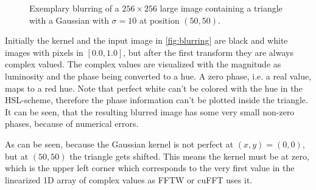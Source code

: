 \documentclass[10pt,a4paper]{article}
\begin{document}
\begin{figure}
\begin{center}
\begin{minipage}{0.5\linewidth}
\begin{center}
\begin{minipage}{0.5\linewidth}
\begin{center}
    \end{center}\end{minipage}\end{center}
    \end{minipage}\end{center}
    \caption{Exemplary blurring of a $256 \times 256$ large image containing a triangle with a Gaussian with $\sigma=10$ at position $(50,50)$.}
    \label{fig:blurring}
\end{figure}

Initially the kernel and the input image in \autoref{fig:blurring} are black and white images with pixels in $[0.0,1.0]$, but after the first transform they are always complex valued.
The complex values are visualized with the magnitude as luminosity and the phase being converted to a hue.
A zero phase, i.e. a real value, maps to a red hue.
Note that perfect white can't be colored with the hue in the HSL-scheme, therefore the phase information can't be plotted inside the triangle.
It can be seen, that the resulting blurred image has some very small non-zero phases, because of numerical errors.

As can be seen, because the Gaussian kernel is not perfect at $(x,y)=(0,0)$, but at $(50,50)$ the triangle gets shifted.
This means the kernel must be at zero, which is the upper left corner which corresponds to the very first value in the linearized 1D array of complex values as FFTW or cuFFT uses it.
\end{document}
